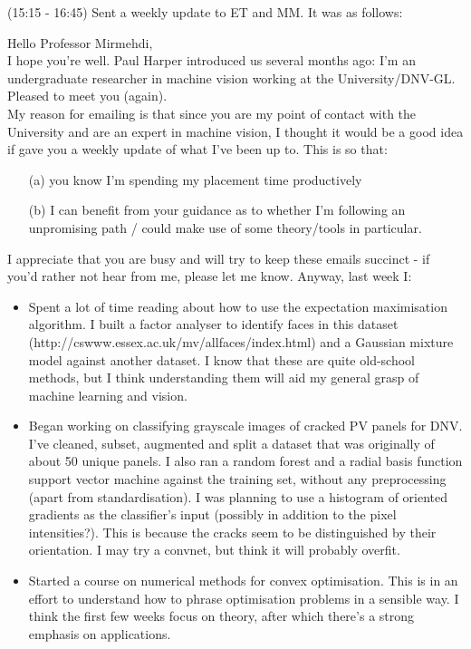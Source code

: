 \documentclass[idxtotoc,hyperref,openany]{labbook} %
\begin{document}
 (15:15 - 16:45) Sent a weekly update to ET and MM. It was as follows:
 \begin{displayquote}
 \small
 Hello Professor Mirmehdi,\\[1em]
I hope you're well. Paul Harper introduced us several months ago: I'm an undergraduate researcher in machine vision working at the University/DNV-GL. Pleased to meet you (again).\\[0.7em]
My reason for emailing is that since you are my point of contact with the University and are an expert in machine vision, I thought it would be a good idea if gave you a weekly update of what I've been up to. This is so that:
\begin{itemize}
\item[(a)] you know I'm spending my placement time productively
\item[(b)] I can benefit from your guidance as to whether I'm following an unpromising path / could make use of some theory/tools in particular.
\end{itemize}
I appreciate that you are busy and will try to keep these emails succinct - if you'd rather not hear from me, please let me know. Anyway, last week I:
\begin{itemize}
\item Spent a lot of time reading about how to use the expectation maximisation algorithm. I built a factor analyser to identify faces in this dataset (http://cswww.essex.ac.uk/mv/allfaces/index.html) and a Gaussian mixture model against another dataset. I know that these are quite old-school methods, but I think understanding them will aid my general grasp of machine learning and vision.
\item Began working on classifying grayscale images of cracked PV panels for DNV. I've cleaned, subset, augmented and split a dataset that was originally of about 50 unique panels. I also ran a random forest and a radial basis function support vector machine against the training set, without any preprocessing (apart from standardisation). I was planning to use a histogram of oriented gradients as the classifier's input (possibly in addition to the pixel intensities?). This is because the cracks seem to be distinguished by their orientation. I may try a convnet, but think it will probably overfit.
\item Started a course on numerical methods for convex optimisation. This is in an effort to understand how to phrase optimisation problems in a sensible way. I think the first few weeks focus on theory, after which there's a strong emphasis on applications.

\end{itemize}
\end{displayquote}
\end{document}
